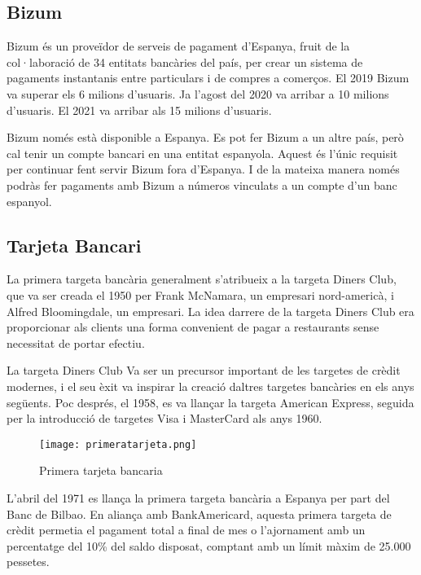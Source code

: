 
\subsection*{Bizum}



Bizum és un proveïdor de serveis de pagament d'Espanya, fruit de la col·laboració de 34 entitats bancàries del país, per crear un sistema de pagaments instantanis entre particulars i de compres a comerços. El 2019 Bizum va superar els 6 milions d'usuaris. Ja l'agost del 2020 va arribar a 10 milions d'usuaris. El 2021 va arribar als 15 milions d'usuaris.

Bizum només està disponible a Espanya. Es pot fer Bizum a un altre país, però cal tenir un compte bancari en una entitat espanyola. Aquest és l'únic requisit per continuar fent servir Bizum fora d'Espanya. I de la mateixa manera només podràs fer pagaments amb Bizum a números vinculats a un compte d'un banc espanyol.



\subsection*{Tarjeta Bancari}




La primera targeta bancària generalment s'atribueix a la targeta Diners Club, que va ser creada el 1950 per Frank McNamara, un empresari nord-americà, i Alfred Bloomingdale, un empresari. La idea darrere de la targeta Diners Club era proporcionar als clients una forma convenient de pagar a restaurants sense necessitat de portar efectiu.

La targeta Diners Club Va ser un precursor important de les targetes de crèdit modernes, i el seu èxit va inspirar la creació daltres targetes bancàries en els anys següents. Poc després, el 1958, es va llançar la targeta American Express, seguida per la introducció de targetes Visa i MasterCard als anys 1960.

\begin{figure}[h]
    \centering
    \texttt{[image: primeratarjeta.png]}
    \caption{Primera tarjeta bancaria}
\end{figure}  


L'abril del 1971 es llança la primera targeta bancària a Espanya per part del Banc de Bilbao. En aliança amb BankAmericard, aquesta primera targeta de crèdit permetia el pagament total a final de mes o l'ajornament amb un percentatge del 10\% del saldo disposat, comptant amb un límit màxim de 25.000 pessetes.



